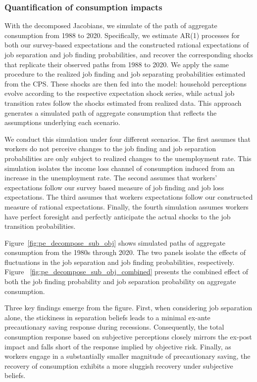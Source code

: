 \subsubsection*{Quantification of consumption impacts}



With the decomposed Jacobians, we simulate of the path of aggregate consumption from 1988 to 2020. Specifically, we estimate AR(1) processes for both our survey-based expectations and the constructed rational expectations of job separation and job finding probabilities, and recover the corresponding shocks that replicate their observed paths from 1988 to 2020. We apply the same procedure to the realized job finding and job separating probabilities estimated from the CPS. These shocks are then fed into the model: household perceptions evolve according to the respective expectation shock series, while actual job transition rates follow the shocks estimated from realized data. This approach generates a simulated path of aggregate consumption that reflects the assumptions underlying each scenario.

We conduct this simulation under four different scenarios. The first assumes that workers do not perceive changes to the job finding and job separation probabilities are only subject to realized changes to the unemployment rate. This simulation isolates the income loss channel of consumption induced from an increase in the unemployment rate. The second assumes that workers' expectations follow our survey based measure of job finding and job loss expectations. The third assumes that workers expectations follow our constructed measure of rational expectations. Finally, the fourth simulation assumes workers have perfect foresight and perfectly anticipate the actual shocks to the job transition probabilities.

Figure~\ref{fig:pe_decompose_sub_obj} shows simulated paths of aggregate consumption from the 1980s through 2020. The two panels isolate the effects of fluctuations in the job separation and job finding probabilities, respectively. Figure ~\ref{fig:pe_decompose_sub_obj_combined} presents the combined effect of both the job finding probability and job separation probability on aggregate consumption. 

Three key findings emerge from the figure. First, when considering job separation alone, the stickiness in separation beliefs leads to a minimal ex-ante precautionary saving response during recessions. Consequently, the total consumption response based on subjective perceptions closely mirrors the ex-post impact and falls short of the response implied by objective risk. Finally, as workers engage in a substantially smaller magnitude of precautionary saving, the recovery of consumption exhibits a more sluggish recovery under subjective beliefs.

